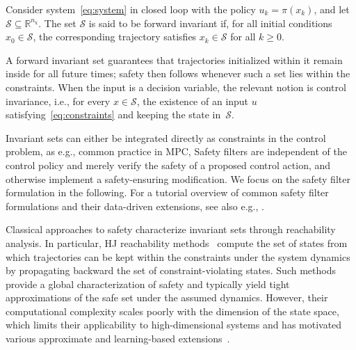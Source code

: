 \begin{defn}
	Consider system~\eqref{eq:system} in closed loop with the policy $u_k=\pi(x_k)$, and let $\mathcal S \subseteq \mathbb R^{n_\mathrm{x}}$. The set $\mathcal S$ is said to be forward invariant if, for all initial conditions $x_0 \in \mathcal S$, the corresponding trajectory satisfies $x_k \in \mathcal S$ for all $k \ge 0$.
\end{defn}

A forward invariant set guarantees that trajectories initialized within it remain inside for all future times; safety then follows whenever such a set lies within the constraints. When the input is a decision variable, the relevant notion is control invariance, i.e., for every $x\in \mathcal S$, the existence of an input $u$ satisfying~\eqref{eq:constraints} and keeping the state in~$\mathcal S$.

Invariant sets can either be integrated directly as constraints in the control problem, as e.g., common practice in \ac{MPC},  Safety filters are independent of the control policy and merely verify the safety of a proposed control action, and otherwise implement a safety-ensuring modification. We focus on the safety filter formulation in the following. For a tutorial overview of common safety filter formulations and their data-driven extensions, see also e.g., \cite{wabersich2023data}.

Classical approaches to safety characterize invariant sets through reachability analysis. In particular, \ac{HJ} reachability methods~\cite{bansal2017hamilton} compute the set of states from which trajectories can be kept within the constraints under the system dynamics by propagating backward the set of constraint-violating states. Such methods provide a global characterization of safety and typically yield tight approximations of the safe set under the assumed dynamics. However, their computational complexity scales poorly with the dimension of the state space, which limits their applicability to high-dimensional systems and has motivated various approximate
and learning-based extensions~\cite{wabersich2023data,8263977,mochen2018hamilton}.

